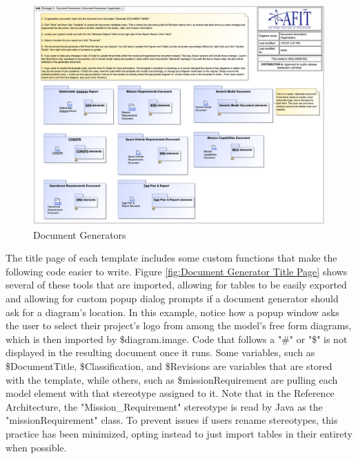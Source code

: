 \begin{figure}[H]
    \centering
    \includegraphics[width=\textwidth]{Thesis/Analysis_and_Results/Analysis and Results Figures/Document Generators.png}
    \caption{Document Generators}
    \label{fig:Document Generators}
\end{figure}

The title page of each template includes some custom functions that make the following code easier to write. Figure \ref{fig:Document Generator Title Page} shows several of these tools that are imported, allowing for tables to be easily exported and allowing for custom popup dialog prompts if a document generator should ask for a diagram's location. In this example, notice how a popup window asks the user to select their project's logo from among the model's free form diagrams, which is then imported by \$diagram.image. Code that follows a "\#" or "\$" is not displayed in the resulting document once it runs. Some variables, such as \$DocumentTitle, \$Classification, and \$Revisions are variables that are stored with the template, while others, such as \$missionRequirement are pulling each model element with that stereotype assigned to it. Note that in the Reference Architecture, the "Mission\_Requirement" stereotype is read by Java as the "missionRequirement" class. To prevent issues if users rename stereotypes, this practice has been minimized, opting instead to just import tables in their entirety when possible.

